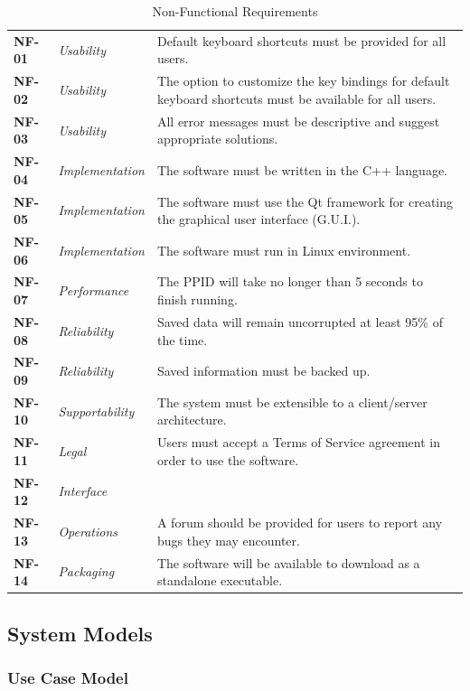 \documentclass[12pt,letterpaper]{article}
\begin{document}
\begin{table}[H]
	\caption{Non-Functional Requirements}
	\vspace{1em}
	\begin{tabu} to 
		NF-01 & Usability & Default keyboard shortcuts must be provided for all users. \\
		NF-02 & Usability & The option to customize the key bindings for default keyboard shortcuts must be available for all users.\\
		NF-03 & Usability & All error messages must be descriptive and suggest appropriate solutions.\\
		NF-04 & Implementation & The software must be written in the C++ language. \\
		NF-05 & Implementation & The software must use the Qt framework for creating the graphical user interface (G.U.I.). \\
		NF-06 & Implementation & The software must run in Linux environment. \\
		NF-07 & Performance & The PPID will take no longer than 5 seconds to finish running. \\
		NF-08 & Reliability & Saved data will remain uncorrupted at least 95\% of the time. \\
		NF-09 & Reliability & Saved information must be backed up. \\
		NF-10 & Supportability & The system must be extensible to a client/server architecture. \\
		NF-11 & Legal & Users must accept a Terms of Service agreement in order to use the software.\\
		NF-12 & Interface & \\
		NF-13 & Operations & A forum should be provided for users to report any bugs they may encounter. \\
		NF-14 & Packaging & The software will be available to download as a standalone executable. \\
	\end{tabu}
\end{table}

\subsection{System Models}

\subsubsection{Use Case Model}
\end{document}
